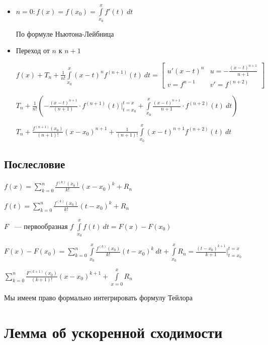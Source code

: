 \documentclass{article}
\begin{document}
			\begin{itemize}

				\item $n = 0 : f(x) = f(x_0) = \int\limits^x_{x_0} f'(t) \ dt$

					По формуле Ньютона-Лейбница

				\item Переход от $n$ к $n + 1$

					$f(x) + T_n + \frac{1}{n!} \int\limits^x_{x_0} (x - t)^n f^{(n + 1)} (t) \ dt = \begin{bmatrix} u' (x - t)^n & u = -\frac{(x - t)^{n + 1}}{n + 1} \\ v = f^{n - 1} & v' = f^{(n + 2)} \end{bmatrix}$
						
					$T_n + \frac{1}{n!} \left( -\frac{(x - t)^{n + 1}}{(n + 1)} \cdot f^{(n + 1)} (t) \bigg|^{t = x}_{t = x_0} + \int\limits^x_{x_0} \frac{(x - t)^{n + 1}}{n + 1} \cdot f^{(n + 2)} (t) \ dt \right)$ 
					
					$T_n + \frac{f^{(n + 1)} (x_0)}{(n + 1)!} (x - x_0)^{n + 1} + \frac{1}{(n + 1)!} \int\limits^x_{x_0} (x - t)^{n + 1} f^{(n + 2)} (t) \ dt$

			\end{itemize}

		\subsection{Послесловие}

			$f(x) = \sum\limits^n_{k = 0} \frac{f^{(k)}(x_0)}{k!} (x - x_0)^k + R_n$

			$f(t) = \sum\limits^n_{k = 0} \frac{f^{(k)}(x_0)}{k!} (t - x_0)^k + R_n$

			$F$ ~--- первообразная $f$  $\int\limits^x_{x_0} f(t) \ dt = F(x) - F(x_0)$

			$F(x) - F(x_0) = \sum\limits^n_{k = 0} \int\limits^x_{x_0} \frac{f^{(k)} (x_0)}{k!} (t - x_0)^k \ dt + \int\limits^x_{x_0} R_n = \frac{(t - x_0)^{k + 1}}{k + 1} \bigg|^{t = x}_{t = x_0}$

			$\sum\limits^n_{k = 0} \frac{F^{(k + 1)} (x_0)}{(k + 1)!} (x - x_0)^{k + 1} + \int\limits^x_{x = 0} R_n$

			Мы имеем право формально интегрировать формулу Тейлора

	\newpage

	\section{Лемма об ускоренной сходимости}
	
\end{document}
